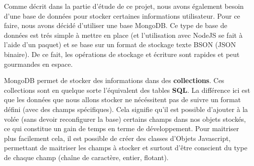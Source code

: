 Comme décrit dans la partie d'étude de ce projet, nous avons également besoin d'une base de données pour stocker certaines informations utilisateur.
Pour ce faire, nous avons décidé d'utiliser une base MongoDB. Ce type de base de données est trés simple à mettre en place (et l'utilisation avec NodeJS se fait à l'aide d'un paquet) et se base sur un format de stockage texte BSON (JSON binaire). De ce fait, les opérations de stockage et écriture sont rapides et peut gourmandes en espace.

MongoDB permet de stocker des informations dans des \textbf{collections}. Ces collections sont en quelque sorte l'équivalent des tables \textbf{SQL}. La différence ici est que les données que nous allons stocker ne nécéssitent pas de suivre un format défini (avec des champs spécifiques). Cela signifie qu'il est possible d'ajouter à la volée (sans devoir reconfigurer la base) certains champs dans nos objets stockés, ce qui constitue un gain de temps en terme de développement. Pour maitriser plus facilement cela, il est possible de créer des classes d'Objets Javascript, permettant de maitriser les champs à stocker et surtout d'être conscient du type de chaque champ (chaîne de caractère, entier, flotant).